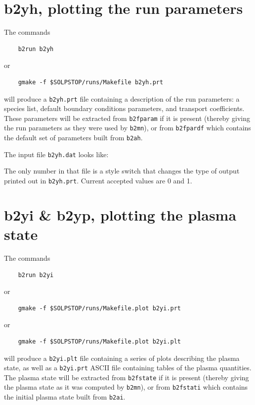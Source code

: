 \documentclass[a4paper,10pt]{report}
\begin{document}
\newpage
\section{b2yh, plotting the run parameters}
\label{sec:b2yh}

The commands
\begin{verbatim}
    b2run b2yh
\end{verbatim}
or
\begin{verbatim}
    gmake -f $SOLPSTOP/runs/Makefile b2yh.prt
\end{verbatim}
will produce a {\tt b2yh.prt} file containing a description of the run
parameters: a species list, default boundary conditions
parameters, and transport coefficients. These parameters will be extracted
from {\tt b2fparam} if it is present (thereby giving the run parameters
as they were used by {\tt b2mn}), or from {\tt b2fpardf} which contains
the default set of parameters built from {\tt b2ah}.

The input file {\tt b2yh.dat} looks like:

The only number in that file is a style switch that changes the type of output
printed out in {\tt b2yh.prt}. Current accepted values are 0 and 1.

\newpage
\section{b2yi \& b2yp, plotting the plasma state}
\label{sec:b2yi}\label{sec:b2yp}

The commands
\begin{verbatim}
    b2run b2yi
\end{verbatim}
or
\begin{verbatim}
    gmake -f $SOLPSTOP/runs/Makefile.plot b2yi.prt
\end{verbatim}
or
\begin{verbatim}
    gmake -f $SOLPSTOP/runs/Makefile.plot b2yi.plt
\end{verbatim}
will produce a {\tt b2yi.plt} file containing a series of plots describing
the plasma state, as well as a {\tt b2yi.prt} ASCII file
containing tables of the plasma quantities. The plasma state will be extracted
from {\tt b2fstate} if it is present (thereby giving the plasma state
as it was computed by {\tt b2mn}), or from {\tt b2fstati} which contains
the initial plasma state built from {\tt b2ai}.
\end{document}
